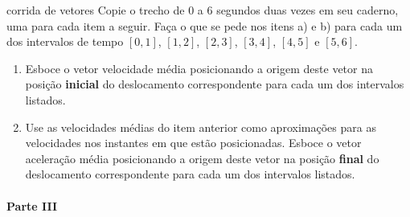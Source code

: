 \begin{task}{ corrida de vetores}
Copie o trecho de 0 a 6 segundos duas vezes em seu caderno, uma para cada item a seguir. Faça o que se pede nos itens a) e b) para cada um dos intervalos de tempo \([0,1]\), \([1,2]\), \([2,3]\), \([3,4]\), \([4,5]\) e \([5,6]\).
\begin{center}\end{center}\begin{enumerate}
\item {} 
Esboce o vetor velocidade média posicionando a origem deste vetor na posição \textbf{inicial} do deslocamento correspondente para cada um dos intervalos listados.

\item {} 
Use as velocidades médias do item anterior como aproximações para as velocidades nos instantes em que estão posicionadas. Esboce o vetor aceleração média posicionando a origem deste vetor na posição \textbf{final} do deslocamento correspondente para cada um dos intervalos listados.

\end{enumerate}

\paragraph{Parte III}


\end{task}
